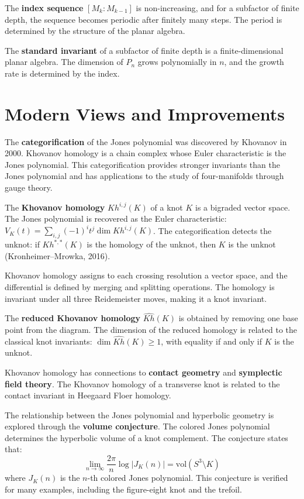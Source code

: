 The \textbf{index sequence} $[M_k : M_{k-1}]$ is non-increasing, and for a subfactor of finite depth, the sequence becomes periodic after finitely many steps. The period is determined by the structure of the planar algebra.

The \textbf{standard invariant} of a subfactor of finite depth is a finite-dimensional planar algebra. The dimension of $P_n$ grows polynomially in $n$, and the growth rate is determined by the index.

\section{Modern Views and Improvements}

The \textbf{categorification} of the Jones polynomial was discovered by Khovanov in 2000. Khovanov homology is a chain complex whose Euler characteristic is the Jones polynomial. This categorification provides stronger invariants than the Jones polynomial and has applications to the study of four-manifolds through gauge theory.

The \textbf{Khovanov homology} $Kh^{i,j}(K)$ of a knot $K$ is a bigraded vector space. The Jones polynomial is recovered as the Euler characteristic: $V_K(t) = \sum_{i,j} (-1)^i t^j \dim Kh^{i,j}(K)$. The categorification detects the unknot: if $Kh^{*,*}(K)$ is the homology of the unknot, then $K$ is the unknot (Kronheimer--Mrowka, 2016).

Khovanov homology assigns to each crossing resolution a vector space, and the differential is defined by merging and splitting operations. The homology is invariant under all three Reidemeister moves, making it a knot invariant.

The \textbf{reduced Khovanov homology} $\widehat{Kh}(K)$ is obtained by removing one base point from the diagram. The dimension of the reduced homology is related to the classical knot invariants: $\dim \widehat{Kh}(K) \geq 1$, with equality if and only if $K$ is the unknot.

Khovanov homology has connections to \textbf{contact geometry} and \textbf{symplectic field theory}. The Khovanov homology of a transverse knot is related to the contact invariant in Heegaard Floer homology.

The relationship between the Jones polynomial and hyperbolic geometry is explored through the \textbf{volume conjecture}. The colored Jones polynomial determines the hyperbolic volume of a knot complement. The conjecture states that:
\[
\lim_{n \to \infty} \frac{2\pi}{n} \log |J_K(n)| = \text{vol}(S^3 \setminus K)
\]
where $J_K(n)$ is the $n$-th colored Jones polynomial. This conjecture is verified for many examples, including the figure-eight knot and the trefoil.

